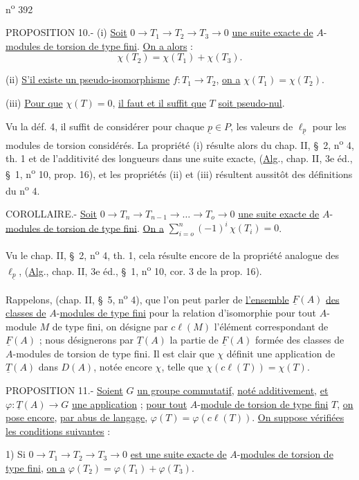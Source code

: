 n\textsuperscript{o} 392

PROPOSITION 10.- (i) \uline{Soit} $0\longrightarrow T_1\longrightarrow T_2\longrightarrow T_3\longrightarrow 0$ \uline{une suite exacte de} $A$-\uline{modules de torsion de type fini}. \uline{On a alors} :
\[
\chi(T_2)=\chi(T_1)+\chi(T_3).
\]

(ii) \quad \uline{S'il existe un pseudo-isomorphisme} $f:T_1\longrightarrow T_2$, \uline{on a} $\chi(T_1)=\chi(T_2)$.

(iii) \uline{Pour que} $\chi(T)=0$, \uline{il faut et il suffit que} $T$ \uline{soit pseudo-nul}.

Vu la déf. 4, il suffit de considérer pour chaque $\underline p\in P$, les valeurs de $\ell_{\underline p}$ pour les modules de torsion considérés. La propriété (i) résulte alors du chap. II, \S~2, n\textsuperscript{o} 4, th. 1 et de l'additivité des longueurs dans une suite exacte, (\uline{Alg}., chap. II, 3e éd., \S~1, n\textsuperscript{o} 10, prop. 16), et les propriétés (ii) et (iii) résultent aussitôt des définitions du n\textsuperscript{o} 4.

COROLLAIRE.- \uline{Soit} $0\longrightarrow T_n\longrightarrow T_{n-1}\longrightarrow\ldots\longrightarrow T_o\longrightarrow 0$ \uline{une suite exacte de} $A$-\uline{modules de torsion de type fini}. \uline{On a} $\displaystyle\sum_{i=o}^{n}(-1)^i\,\chi(T_i)=0$.

Vu le chap. II, \S~2, n\textsuperscript{o} 4, th. 1, cela résulte encore de la propriété analogue des $\ell_{\underline p}$, (\uline{Alg}., chap. II, 3e éd., \S~1, n\textsuperscript{o} 10, cor. 3 de la prop. 16).

Rappelons, (chap. II, \S~5, n\textsuperscript{o} 4), que l'on peut parler de \uline{l'ensemble} $\underline F(A)$ \uline{des classes de} $A$-\uline{modules de type fini} pour la relation d'isomorphie pour tout $A$-module $M$ de type fini, on désigne par $c\ell(M)$ l'élément correspondant de $\underline F(A)$ ; nous désignerons par $\underline T(A)$ la partie de $\underline F(A)$ formée des classes de $A$-modules de torsion de type fini. Il est clair que $\chi$ définit une application de $\underline T(A)$ dans $D(A)$, notée encore $\chi$, telle que $\chi(c\ell(T))=\chi(T)$.

PROPOSITION 11.- \uline{Soient} $G$ \uline{un groupe commutatif}, \uline{noté additivement}, \uline{et} $\varphi:\underline T(A)\longrightarrow G$ \uline{une application} ; \uline{pour tout} $A$-\uline{module de torsion de type fini} $T$, \uline{on pose encore}, \uline{par abus de langage}, $\varphi(T)=\varphi(c\ell(T))$. \uline{On suppose vérifiées les conditions suivantes} :

1) Si $0\longrightarrow T_1\longrightarrow T_2\longrightarrow T_3\longrightarrow 0$ \uline{est une suite exacte de} $A$-\uline{modules de torsion de type fini}, \uline{on a} $\varphi(T_2)=\varphi(T_1)+\varphi(T_3)$.

